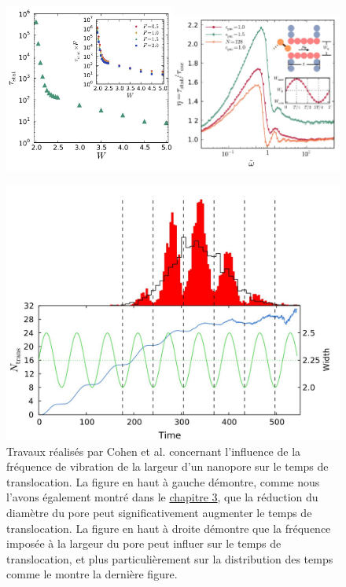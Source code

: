 \begin{figure}[H]
\includegraphics[width=0.5\textwidth]{porevib3.jpg}\includegraphics[width=0.5\textwidth]{porevib1.jpg} 
\begin{minipage}{0.5\linewidth}
\includegraphics[width=\textwidth]{porevib2.jpg}
\end{minipage}
\begin{minipage}{0.5\linewidth} 
\caption[Vibration imposées]{Travaux réalisés par Cohen et al. \cite{Cohen2011} concernant l'influence de la fréquence de vibration de la largeur d'un nanopore sur le temps de translocation. La figure en haut à gauche démontre, comme nous l'avons également montré dans le \hyperref[sptransloc]{chapitre 3}, que la réduction du diamètre du pore peut significativement augmenter le temps de translocation. La figure en haut à droite démontre que la fréquence imposée à la largeur du pore peut influer sur le temps de translocation, et plus particulièrement sur la distribution des temps comme le montre la dernière figure.}
\label{vibporewidth}
\end{minipage}
\end{figure}

